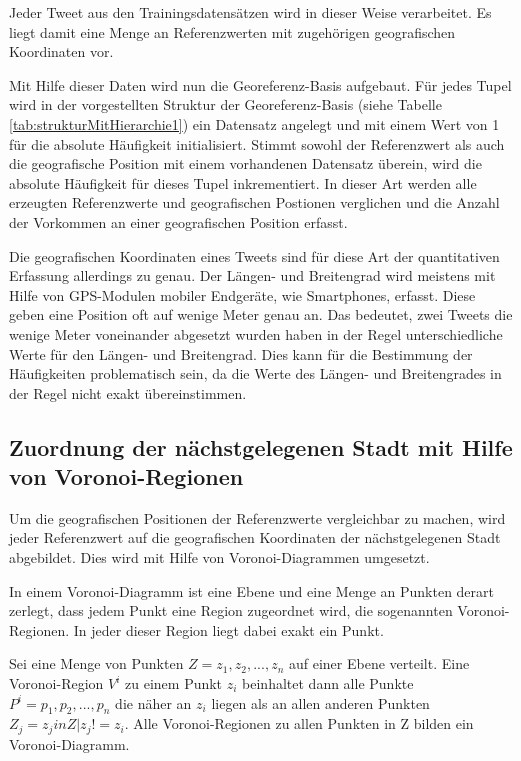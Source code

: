 			Jeder Tweet aus den Trainingsdatensätzen wird in dieser Weise verarbeitet. 
			Es liegt damit eine Menge an Referenzwerten mit zugehörigen geografischen Koordinaten vor.

			Mit Hilfe dieser Daten wird nun die Georeferenz-Basis aufgebaut. 
			Für jedes Tupel wird in der vorgestellten Struktur der Georeferenz-Basis (siehe Tabelle \ref{tab:strukturMitHierarchie1}) ein Datensatz angelegt und mit einem Wert von 1 für die absolute Häufigkeit initialisiert. 
			Stimmt sowohl der Referenzwert als auch die geografische Position mit einem vorhandenen Datensatz überein, wird die absolute Häufigkeit für dieses Tupel inkrementiert.
			In dieser Art werden alle erzeugten Referenzwerte und geografischen Postionen verglichen und die Anzahl der Vorkommen an einer geografischen Position erfasst.

			Die geografischen Koordinaten eines Tweets sind für diese Art der quantitativen Erfassung allerdings zu genau. 
			Der Längen- und Breitengrad wird meistens mit Hilfe von GPS-Modulen mobiler Endgeräte, wie Smartphones, erfasst.
			Diese geben eine Position oft auf wenige Meter genau an.
			Das bedeutet, zwei Tweets die wenige Meter voneinander abgesetzt wurden haben in der Regel unterschiedliche Werte für den Längen- und Breitengrad.
			Dies kann für die Bestimmung der Häufigkeiten problematisch sein, da die Werte des Längen- und Breitengrades in der Regel nicht exakt übereinstimmen.

		\subsection{Zuordnung der nächstgelegenen Stadt mit Hilfe von Voronoi-Regionen} 

			Um die geografischen Positionen der Referenzwerte vergleichbar zu machen, wird jeder Referenzwert auf die geografischen Koordinaten der nächstgelegenen Stadt abgebildet.
			Dies wird mit Hilfe von Voronoi-Diagrammen umgesetzt.

			In einem Voronoi-Diagramm ist eine Ebene und eine Menge an Punkten derart zerlegt, dass jedem Punkt eine Region zugeordnet wird, die sogenannten Voronoi-Regionen.
			In jeder dieser Region liegt dabei exakt ein Punkt.  

			Sei eine Menge von Punkten $Z = {z_1,z_2,...,z_n}$ auf einer Ebene verteilt.
			Eine Voronoi-Region $V^i$ zu einem Punkt $z_i$ beinhaltet dann alle Punkte $P^i={p_1,p_2,...,p_n}$ die näher an $z_i$ liegen als an allen anderen Punkten $Z_j={z_j in Z|z_j!=z_i}$.
			Alle Voronoi-Regionen zu allen Punkten in Z bilden ein Voronoi-Diagramm.


